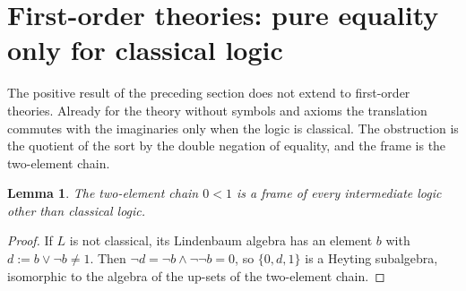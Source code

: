 \documentclass[11pt]{amsart}
\newtheorem{lem}[thm]{Lemma}
\theoremstyle{definition}
\begin{document}
\section{First-order theories: pure equality only for classical logic}

The positive result of the preceding section does not extend to
first-order theories. Already for the theory without symbols and
axioms the translation commutes with the imaginaries only when the
logic is classical. The obstruction is the quotient of the sort by the
double negation of equality, and the frame is the two-element chain.

\begin{lem}\label{lem:two}
The two-element chain $0<1$ is a frame of every intermediate logic
other than classical logic.
\end{lem}
\begin{proof}
If $L$ is not classical, its Lindenbaum algebra has an element $b$ with
$d:=b\vee\neg b\ne1$. Then $\neg d=\neg b\wedge\neg\neg b=0$, so
$\{0,d,1\}$ is a Heyting subalgebra, isomorphic to the algebra of the
up-sets of the two-element chain.
\end{proof}
\end{document}
